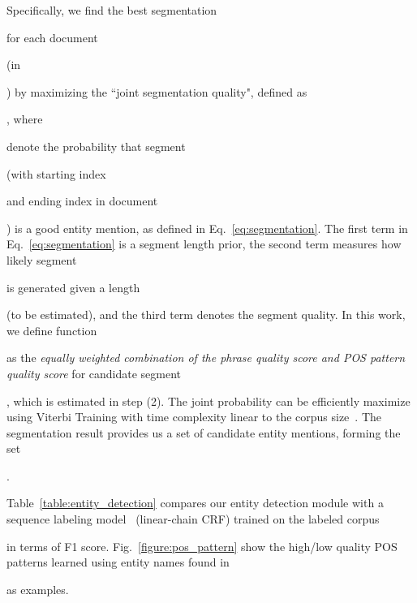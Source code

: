 \documentclass[letterpaper]{sig-alternate-2013}
\begin{document}
Specifically, we find the best segmentation \begin{small}\end{small} for each document \begin{small}\end{small} (in \begin{small}\end{small}) by maximizing the ``joint segmentation quality", defined as \begin{scriptsize}\end{scriptsize}, where \begin{scriptsize}\end{scriptsize} denote the probability that segment \begin{small}\end{small} (with starting index \begin{small}\end{small} and ending index in document \begin{small}\end{small}) is a good entity mention, as defined in Eq.~\eqref{eq:segmentation}. The first term in Eq.~\eqref{eq:segmentation} is a segment length prior, the second term measures how likely segment \begin{small}\end{small} is generated given a length \begin{small}\end{small} (to be estimated), and the third term denotes the segment quality. In this work, we define function \begin{small}\end{small} as the \textit{equally weighted combination of the phrase quality score and POS pattern quality score} for candidate segment \begin{small}\end{small}, which is estimated in step (2). The joint probability can be efficiently maximize using Viterbi Training with time complexity linear to the corpus size~\cite{liu2015mining}. The segmentation result provides us a set of candidate entity mentions, forming the set \begin{small}\end{small}.

Table~\ref{table:entity_detection} compares our entity detection module with a sequence labeling model~\cite{ling2012fine} (linear-chain CRF) trained on the labeled corpus \begin{small}\end{small} in terms of F1 score. Fig.~\ref{figure:pos_pattern} show the high/low quality POS patterns learned using entity names found  in \begin{small}\end{small} as examples.
\end{document}
